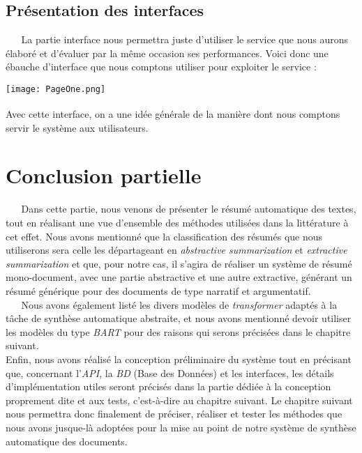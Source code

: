 \subsection{Présentation des interfaces}
$ _{} $ $ _{} $ $ _{} $ $ _{} $ $ _{} $La partie interface nous permettra juste d'utiliser le service que nous aurons élaboré et d'évaluer par la même occasion ses performances. Voici donc une ébauche d'interface que nous comptons utiliser pour exploiter le service :
$ _{ } $\\
\begin{center}
\texttt{[image: PageOne.png]}
\label{EbaucheInterface}
\end{center}
$ _{ } $\\
Avec cette interface, on a une idée générale de la manière dont nous comptons servir le système aux utilisateurs.
\section{Conclusion partielle}
$ _{} $ $ _{} $ $ _{} $ $ _{} $ $ _{} $Dans cette partie, nous venons de présenter le résumé automatique des textes, tout en réalisant une vue d'ensemble des méthodes utilisées dans la littérature à cet effet. Nous avons mentionné que la classification des résumés que nous utiliserons sera celle les départageant en \textit{abstractive summarization} et \textit{extractive summarization} et que, pour notre cas, il s'agira de réaliser un système de résumé mono-document, avec une partie abstractive et une autre extractive, générant un résumé générique pour des documents de type narratif et argumentatif.\\
$ _{} $ $ _{} $ $ _{} $ $ _{} $ $ _{} $Nous avons également listé les divers modèles de \textit{transformer} adaptés à la tâche de synthèse automatique abstraite, et nous avons mentionné devoir utiliser les modèles du type \textit{BART} pour des raisons qui serons précisées dans le chapitre suivant.\\
Enfin, nous avons réalisé la conception préliminaire du système tout en précisant que, concernant l'\textit{API}, la \textit{BD} (Base des Données) et les interfaces, les détails d'implémentation utiles seront précisés dans la partie dédiée à la conception proprement dite et aux tests, c'est-à-dire au chapitre suivant. Le chapitre suivant nous permettra donc finalement de préciser, réaliser et tester les méthodes que nous avons jusque-là adoptées pour la mise au point de notre système de synthèse automatique des documents.